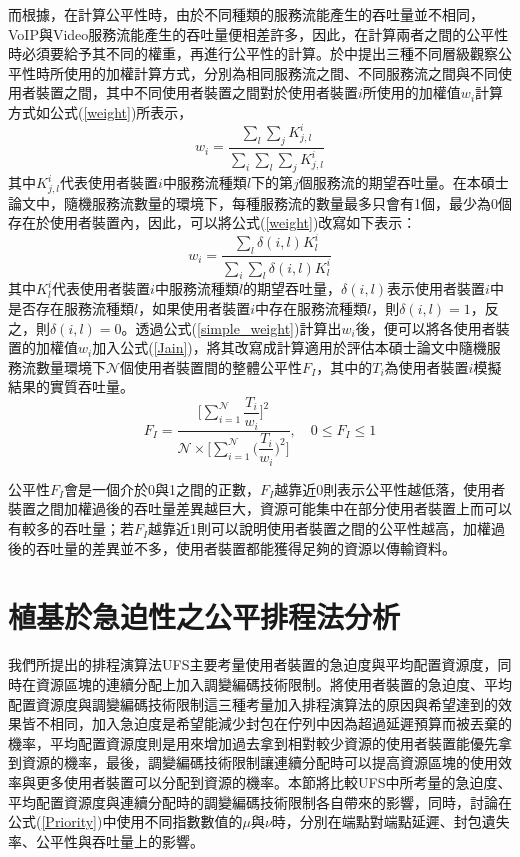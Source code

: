 而根據\cite{ferng2009}，在計算公平性時，由於不同種類的服務流能產生的吞吐量並不相同，VoIP與Video服務流能產生的吞吐量便相差許多，因此，在計算兩者之間的公平性時必須要給予其不同的權重，再進行公平性的計算。於\cite{ferng2009}中提出三種不同層級觀察公平性時所使用的加權計算方式，分別為相同服務流之間、不同服務流之間與不同使用者裝置之間，其中不同使用者裝置之間對於使用者裝置$i$所使用的加權值$w_i$計算方式如公式(\ref{weight})所表示，
\begin{equation}
\label{weight}
w_i=\dfrac{\sum_l\sum_jK_{j,l}^i}{\sum_i\sum_l\sum_jK_{j,l}^i}
\end{equation}
其中$K_{j,l}^i$代表使用者裝置$i$中服務流種類$l$下的第$j$個服務流的期望吞吐量。在本碩士論文中，隨機服務流數量的環境下，每種服務流的數量最多只會有1個，最少為0個存在於使用者裝置內，因此，可以將公式(\ref{weight})改寫如下表示：
\begin{equation}
\label{simple_weight}
w_i=\dfrac{\sum_l\delta(i,l)K_l^i}{\sum_i\sum_l\delta(i,l)K_l^i}
\end{equation}
其中$K_l^i$代表使用者裝置$i$中服務流種類$l$的期望吞吐量，$\delta(i,l)$表示使用者裝置$i$中是否存在服務流種類$l$，如果使用者裝置$i$中存在服務流種類$l$，則$\delta(i,l)=1$，反之，則$\delta(i,l)=0$。透過公式(\ref{simple_weight})計算出$w_i$後，便可以將各使用者裝置的加權值$w_i$加入公式(\ref{Jain})，將其改寫成計算適用於評估本碩士論文中隨機服務流數量環境下$\mathcal{N}$個使用者裝置間的整體公平性$F_I$，其中的$T_i$為使用者裝置$i$模擬結果的實質吞吐量。
\begin{equation}
\label{fairness_index}
F_I=\dfrac{\Bigg[\sum\limits_{i=1}^\mathcal{N}\dfrac{T_i}{w_i}\Bigg]^2}{\mathcal{N}\times\Bigg[\sum\limits_{i=1}^\mathcal{N}\Big(\dfrac{T_i}{w_i}\Big)^2\Bigg]},
\quad 0\leq F_I\leq 1
\end{equation}

公平性$F_I$會是一個介於0與1之間的正數，$F_I$越靠近0則表示公平性越低落，使用者裝置之間加權過後的吞吐量差異越巨大，資源可能集中在部分使用者裝置上而可以有較多的吞吐量；若$F_I$越靠近1則可以說明使用者裝置之間的公平性越高，加權過後的吞吐量的差異並不多，使用者裝置都能獲得足夠的資源以傳輸資料。
\section{植基於急迫性之公平排程法分析}
我們所提出的排程演算法UFS主要考量使用者裝置的急迫度與平均配置資源度，同時在資源區塊的連續分配上加入調變編碼技術限制。將使用者裝置的急迫度、平均配置資源度與調變編碼技術限制這三種考量加入排程演算法的原因與希望達到的效果皆不相同，加入急迫度是希望能減少封包在佇列中因為超過延遲預算而被丟棄的機率，平均配置資源度則是用來增加過去拿到相對較少資源的使用者裝置能優先拿到資源的機率，最後，調變編碼技術限制讓連續分配時可以提高資源區塊的使用效率與更多使用者裝置可以分配到資源的機率。本節將比較UFS中所考量的急迫度、平均配置資源度與連續分配時的調變編碼技術限制各自帶來的影響，同時，討論在公式(\ref{Priority})中使用不同指數數值的$\mu$與$\nu$時，分別在端點對端點延遲、封包遺失率、公平性與吞吐量上的影響。
\clearpage
